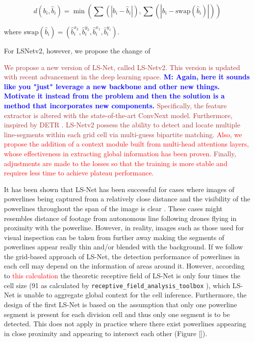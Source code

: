 \documentclass[journal]{IEEEtran}
\newcommand{\commentM}[1]{\textbf{\textcolor{blue}{M: #1}}}
\begin{document}
\begin{equation}
  d(b_i, \hat{b}_i) = \min(\sum (|b_i - \hat{b}_i|), \sum(|b_i - \text{swap}(\hat{b}_i)|))
\end{equation}

where $\text{swap}(\hat{b}_i) = (\hat{b}_i^{x_2}, \hat{b}_i^{y_2}, \hat{b}_i^{x_1}, \hat{b}_i^{y_1})$.

For LSNetv2, however, we propose the change of 




\textcolor{brown}{We propose a new version of LS-Net, called LS-Netv2. This version is updated with recent advancement in the deep learning space. \commentM{Again, here it sounds like you "just" leverage a new backbone and other new things. Motivate it instead from the problem and then the solution is a method that incorporates new components.}
Specifically, the feature extractor is altered with the state-of-the-art ConvNext model. Furthermore, inspired by DETR \cite{DETR}. LS-Netv2 possess the ability to detect and locate multiple line-segments within each grid cell via multi-guess bipartite matching.  \textcolor{red}{Also, we propose the addition of a context module built from multi-head attentions layers, whose effectiveness in extracting global information has been proven}. Finally, \textcolor{red}{adjustments are made to the losses so that the training is more stable and requires less time to achieve plateau performance}.}

It has been shown that LS-Net has been successful for cases where images of powerlines being captured from a relatively close distance and the visibility of the powerlines throughout the span of the image is clear \cite{Nguyen2020}. These cases might resembles distance of footage from autonomous line following drones flying in proximity with the powerline. However, in reality, images such as those used for visual inspection can be taken from further away making the segments of powerlines appear really thin and/or blended with the background. If we follow the grid-based approach of LS-Net, the detection performance of powerlines in each cell may depend on the information of areas around it. However, according to \textcolor{red}{this calculation} the theoretic receptive field of LS-Net is only four times the cell size (91 as calculated by \texttt{receptive\_field\_analysis\_toolbox} \cite{receptive_field_analysis_toolbox}), which LS-Net is unable to aggregate global context for the cell inference. Furthermore, the design of the first LS-Net is based on the assumption that only one powerline segment is present for each division cell and thus only one segment is to be detected. This does not apply in practice where there exist powerlines appearing in close proximity and appearing to intersect each other (Figure \ref{}).
\end{document}
